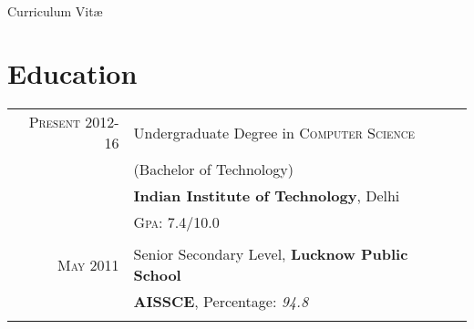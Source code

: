 \documentclass[10pt]{article} %
\begin{document}
\color{text1} %


\par{\\ %

\LARGE{\color{headings} Curriculum {Vit\ae}\\[15pt]\par} %
\normalsize
	

\begin{minipage}[t]{0.5\textwidth} %
\vspace{0pt} %



\section{Education}

\begin{tabular}{rl}	


\textsc{Present} 2012-16& Undergraduate Degree in \textsc{}\textsc{Computer Science} \\
&\footnotesize(Bachelor of Technology)\normalsize \\
&\textbf{Indian Institute of Technology}, Delhi\\
&\normalsize \textsc{Gpa}: 7.4/10.0 \\
&\\


\textsc{May} 2011 & Senior Secondary Level, \textbf{Lucknow Public School}\\
&\textbf{AISSCE}, Percentage: \emph{94.8}\\

&\\


\end{tabular}
\end{minipage}}
\end{document}
